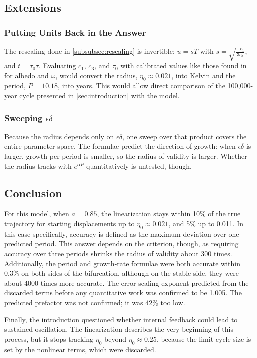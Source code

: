 \subsection{Extensions}
\subsubsection{Putting Units Back in the Answer}
The rescaling done in \ref{subsubsec:rescaling} is invertible: $u=sT$ with $s=\sqrt{\frac{-c_1}{3c_3}}$, and $t=\tau_0\tau$. Evaluating $c_1$, $c_3$, and $\tau_0$ with calibrated values like those found in \cite{dortmansEnergyBalance2019} for albedo and $\omega$, would convert the radius, $\eta_0\approx0.021$, into Kelvin and the period, $P=10.18$, into years. This would allow direct comparison of the 100,000-year cycle presented in \ref{sec:introduction} with the model.

\subsubsection{Sweeping $\epsilon\delta$}
Because the radius depends only on $\epsilon\delta$, one sweep over that product covers the entire parameter space. The formulae predict the direction of growth: when $\epsilon\delta$ is larger, growth per period is smaller, so the radius of validity is larger. Whether the radius tracks with $e^{\alpha P}$ quantitatively is untested, though.

\subsection{Conclusion}
For this model, when $a=0.85$, the linearization stays within 10\% of the true trajectory for starting displacements up to $\eta_0\approx 0.021$, and 5\% up to 0.011. In this case specifically, accuracy is defined as the maximum deviation over one predicted period. This answer depends on the criterion, though, as requiring accuracy over three periods shrinks the radius of validity about 300 times. Additionally, the period and growth-rate formulae were both accurate within 0.3\% on both sides of the bifurcation, although on the stable side, they were about 4000 times more accurate. The error-scaling exponent predicted from the discarded terms before any quantitative work was confirmed to be 1.005. The predicted prefactor was not confirmed; it was 42\% too low. 

Finally, the introduction questioned whether internal feedback could lead to sustained oscillation. The linearization describes the very beginning of this process, but it stops tracking $\eta_0$ beyond $\eta_0\approx 0.25$, because the limit-cycle size is set by the nonlinear terms, which were discarded.



